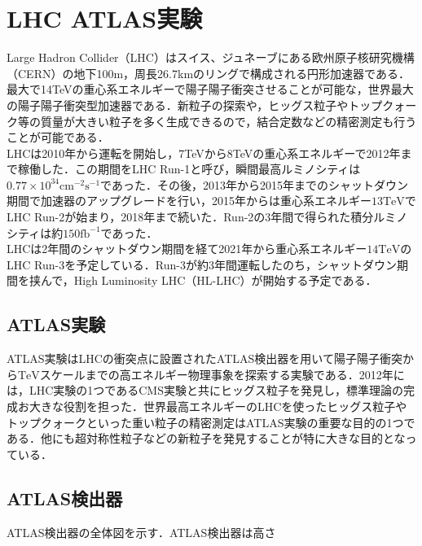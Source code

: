 \chapter{LHC ATLAS実験}
Large Hadron Collider（LHC）はスイス、ジュネーブにある欧州原子核研究機構（CERN）の地下100m，周長26.7kmのリングで構成される円形加速器である．最大で14TeVの重心系エネルギーで陽子陽子衝突させることが可能な，世界最大の陽子陽子衝突型加速器である．新粒子の探索や，ヒッグス粒子やトップクォーク等の質量が大きい粒子を多く生成できるので，結合定数などの精密測定も行うことが可能である．\\
LHCは2010年から運転を開始し，7TeVから8TeVの重心系エネルギーで2012年まで稼働した．この期間をLHC Run-1と呼び，瞬間最高ルミノシティは$0.77\times10^{34} \mathrm{cm^{-2}s^{-1}}$であった．その後，2013年から2015年までのシャットダウン期間で加速器のアップグレードを行い，2015年からは重心系エネルギー$13\mathrm{TeV}$でLHC Run-2が始まり，2018年まで続いた．Run-2の3年間で得られた積分ルミノシティは約$150\mathrm{fb}^{-1}$であった．\\
LHCは2年間のシャットダウン期間を経て2021年から重心系エネルギー$14\mathrm{TeV}$のLHC Run-3を予定している．Run-3が約3年間運転したのち，シャットダウン期間を挟んで，High Luminosity LHC（HL-LHC）が開始する予定である．

\section{ATLAS実験}
ATLAS実験はLHCの衝突点に設置されたATLAS検出器を用いて陽子陽子衝突から$\mathrm{TeV}$スケールまでの高エネルギー物理事象を探索する実験である．2012年には，LHC実験の1つであるCMS実験と共にヒッグス粒子を発見し，標準理論の完成お大きな役割を担った．世界最高エネルギーのLHCを使ったヒッグス粒子やトップクォークといった重い粒子の精密測定はATLAS実験の重要な目的の1つである．他にも超対称性粒子などの新粒子を発見することが特に大きな目的となっている．

\section{ATLAS検出器}
ATLAS検出器の全体図を示す．ATLAS検出器は高さ
